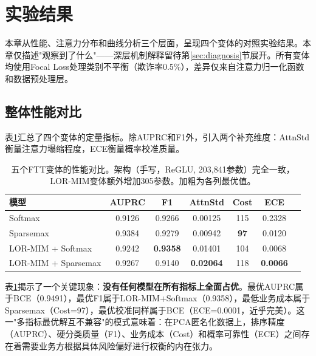 
\section{实验结果}
\label{sec:results}

本章从性能、注意力分布和曲线分析三个层面，呈现四个变体的对照实验结果。本章仅描述"观察到了什么"——深层机制解释留待第\ref{sec:diagnosis}节展开。所有变体均使用Focal Loss处理类别不平衡（欺诈率0.5\%），差异仅来自注意力归一化函数和数据预处理层。

\subsection{整体性能对比}

表\ref{tab:main_results}汇总了四个变体的定量指标。除AUPRC和F1外，引入两个补充维度：AttnStd衡量注意力塌缩程度，ECE衡量概率校准质量。

\begin{table}[H]
\centering
\caption{五个FTT变体的性能对比。架构（手写，ReGLU, 203,841参数）完全一致，LOR-MIM变体额外增加305参数。加粗为各列最优值。}
\label{tab:main_results}
\begin{tabular}{lcccccc}
\toprule
\textbf{模型} & \textbf{AUPRC} & \textbf{F1} & \textbf{AttnStd} & \textbf{Cost} & \textbf{ECE} \\
\midrule
Softmax            & 0.9126 & 0.9266 & 0.00125 & 115 & 0.2328 \\
Sparsemax          & 0.9384 & 0.9279 & 0.00942 & \textbf{97} & 0.0120 \\
LOR-MIM + Softmax  & 0.9242 & \textbf{0.9358} & 0.01401 & 104 & 0.0068 \\
LOR-MIM + Sparsemax& 0.9267 & 0.9140 & \textbf{0.02064} & 118 & \textbf{0.0066} \\
\bottomrule
\end{tabular}
\end{table}

表\ref{tab:main_results}揭示了一个关键现象：\textbf{没有任何模型在所有指标上全面占优}。最优AUPRC属于BCE（0.9491），最优F1属于LOR-MIM+Softmax（0.9358），最低业务成本属于Sparsemax（Cost=97），最优校准同样属于BCE（ECE=0.0001，近乎完美）。这一"多指标最优解互不兼容"的模式意味着：在PCA匿名化数据上，排序精度（AUPRC）、硬分类质量（F1）、业务成本（Cost）和概率可靠性（ECE）之间存在着需要业务方根据具体风险偏好进行权衡的内在张力。

